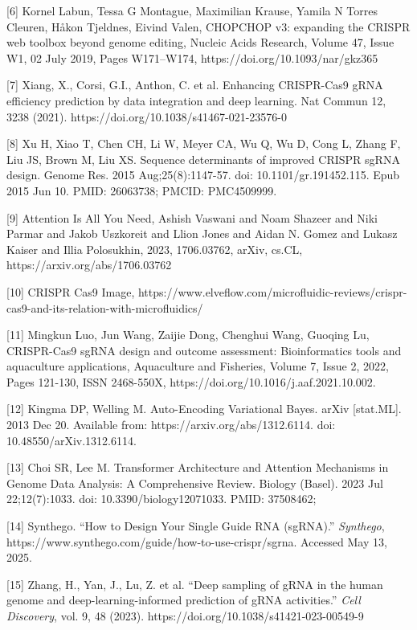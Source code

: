 \documentclass{article}
\begin{document}
\label{Reference 6} [6] Kornel Labun, Tessa G Montague, Maximilian Krause, Yamila N Torres Cleuren, Håkon Tjeldnes, Eivind Valen, CHOPCHOP v3: expanding the CRISPR web toolbox beyond genome editing, Nucleic Acids Research, Volume 47, Issue W1, 02 July 2019, Pages W171–W174, https://doi.org/10.1093/nar/gkz365

\label{Reference 7} [7] Xiang, X., Corsi, G.I., Anthon, C. et al. Enhancing CRISPR-Cas9 gRNA efficiency prediction by data integration and deep learning. Nat Commun 12, 3238 (2021). https://doi.org/10.1038/s41467-021-23576-0

\label{Reference 8} [8] Xu H, Xiao T, Chen CH, Li W, Meyer CA, Wu Q, Wu D, Cong L, Zhang F, Liu JS, Brown M, Liu XS. Sequence determinants of improved CRISPR sgRNA design. Genome Res. 2015 Aug;25(8):1147-57. doi: 10.1101/gr.191452.115. Epub 2015 Jun 10. PMID: 26063738; PMCID: PMC4509999. 

\label{Reference 9} [9] Attention Is All You Need, Ashish Vaswani and Noam Shazeer and Niki Parmar and Jakob Uszkoreit and Llion Jones and Aidan N. Gomez and Lukasz Kaiser and Illia Polosukhin, 2023, 1706.03762, arXiv, cs.CL, https://arxiv.org/abs/1706.03762

\label{Reference 10} [10] CRISPR Cas9 Image, https://www.elveflow.com/microfluidic-reviews/crispr-cas9-and-its-relation-with-microfluidics/

\label{Reference 11} [11] Mingkun Luo, Jun Wang, Zaijie Dong, Chenghui Wang, Guoqing Lu, CRISPR-Cas9 sgRNA design and outcome assessment: Bioinformatics tools and aquaculture applications, Aquaculture and Fisheries, Volume 7, Issue 2, 2022, Pages 121-130, ISSN 2468-550X, https://doi.org/10.1016/j.aaf.2021.10.002.

\label{Reference 12} [12] Kingma DP, Welling M. Auto-Encoding Variational Bayes. arXiv [stat.ML]. 2013 Dec 20. Available from: https://arxiv.org/abs/1312.6114. doi: 10.48550/arXiv.1312.6114.

\label{Reference 13} [13] Choi SR, Lee M. Transformer Architecture and Attention Mechanisms in Genome Data Analysis: A Comprehensive Review. Biology (Basel). 2023 Jul 22;12(7):1033. doi: 10.3390/biology12071033. PMID: 37508462;

\label{Reference 14} [14] Synthego. “How to Design Your Single Guide RNA (sgRNA).” \textit{Synthego}, https://www.synthego.com/guide/how-to-use-crispr/sgrna. Accessed May 13, 2025.

\label{Reference 15} [15] Zhang, H., Yan, J., Lu, Z. et al. “Deep sampling of gRNA in the human genome and deep-learning-informed prediction of gRNA activities.” \textit{Cell Discovery}, vol. 9, 48 (2023). https://doi.org/10.1038/s41421-023-00549-9
\end{document}
